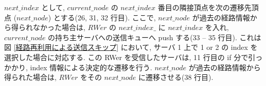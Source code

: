 $next\_index$ として, $current\_node$ の $next\_index$ 番目の隣接頂点を次の遷移先頂点 ($next\_node$) とする(26, 31, 32 行目). ここで, $next\_node$ が過去の経路情報から得られなかった場合は, $RWer$ の $next\_index\_$ に $next\_index$ を入れ, $current\_node$ の持ち主サーバへの送信キューへ push する(33 -- 35 行目). これは図 \ref{経路再利用による送信スキップ} において, サーバ 1 上で 1 or 2 の index を選択した場合に対応する. この RWer を受信したサーバは, 11 行目の if 分で引っかかり, index 情報による決定的な遷移を行う. $next\_node$ が過去の経路情報から得られた場合は, $RWer$ をその $next\_node$ に遷移させる(38 行目). 

